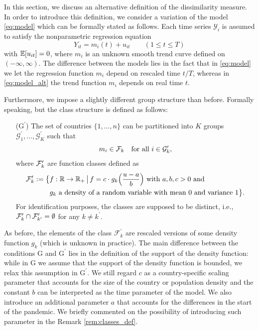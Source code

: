 \documentclass[a4paper,12pt]{article}
\numberwithin{equation}{section}
\begin{document}
In this section, we discuss an alternative definition of the dissimilarity measure. In order to introduce this definition, we consider a variation of the model \eqref{eq:model} which can be formally stated as follows. Each time series $\mathcal{Y}_i$ is assumed to satisfy the nonparametric regression equation
\begin{equation}\label{eq:model_alt}
Y_{it} = m_i(t) + u_{it} \qquad (1 \le t \le T) 
\end{equation}
with $\mathbb{E}[u_{it}]= 0$, where $m_i$ is an unknown smooth trend curve defined on $(-\infty, \infty)$. The difference between the models lies in the fact that in \eqref{eq:model} we let the regression function $m_i$ depend on rescaled time $t/T$, whereas in \eqref{eq:model_alt} the trend function $m_i$ depends on real time $t$. 

Furthermore, we impose a slightly different group structure than before. Formally speaking, but the class structure is defined as follows:

\begin{enumerate}[leftmargin=0.8cm]
\item[($\text{G}^\prime$)] The set of countries $\{1,\ldots,n\}$ can be partitioned into $K$ groups $\mathcal{G}^\prime_1,\ldots,\mathcal{G}^\prime_K$ such that 
\[ m_i \in \mathcal{F}_k \quad \text{for all } i \in \mathcal{G}^\prime_k, \]
where $\mathcal{F}^\prime_k$ are function classes defined as
\begin{align*} \mathcal{F}^\prime_k := \big\{ & f:\mathbb{R} \rightarrow \mathbb{R}_{+} \,\big|\, f = c \cdot g_k\Big(\frac{u - a}{b}\Big) \text{ with } a, b, c > 0 \text{ and } \\
& g_k \text{ a density of a random variable with mean } 0 \text{ and variance } 1 \big\}.
\end{align*}
For identification purposes, the classes are supposed to be distinct, \linebreak i.e., $\mathcal{F}_k^\prime \cap \mathcal{F}_{k^\prime}^\prime = \emptyset$ for any $k \neq k^\prime$. 
\end{enumerate}

As before, the elements of the class $\mathcal{F}^\prime_k$ are rescaled versions of some density function $g_k$ (which is unknown in practice). The main difference between the conditions $\text{G}$ and $\text{G}^\prime$ lies in the definition of the support of the density function: while in $\text{G}$ we assume that the support of the density function is bounded, we relax this assumption in $\text{G}^\prime$. We still regard $c$ as a country-specific scaling parameter that accounts for the size of the country or population density and the constant $b$ can be interpreted as the time parameter of the model. We also introduce an additional parameter $a$ that accounts for the differences in the start of the pandemic. We briefly commented on the possibility of introducing such parameter in the Remark \ref{rem:classes_def}.
\end{document}
